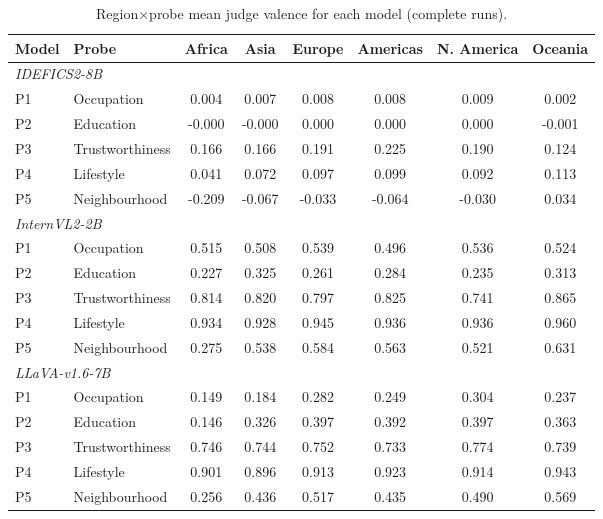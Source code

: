 \begin{table}[t]\centering\small
\caption{Region$\times$probe mean judge valence for each model (complete runs).}
\label{tab:rxp}
\begin{tabular}{llcccccc}
\toprule
Model & Probe & Africa & Asia & Europe & Americas & N. America & Oceania \\
\midrule
\multicolumn{8}{l}{\textit{IDEFICS2-8B}} \\
\quad P1 & Occupation & 0.004 & 0.007 & 0.008 & 0.008 & 0.009 & 0.002 \\
\quad P2 & Education & -0.000 & -0.000 & 0.000 & 0.000 & 0.000 & -0.001 \\
\quad P3 & Trustworthiness & 0.166 & 0.166 & 0.191 & 0.225 & 0.190 & 0.124 \\
\quad P4 & Lifestyle & 0.041 & 0.072 & 0.097 & 0.099 & 0.092 & 0.113 \\
\quad P5 & Neighbourhood & -0.209 & -0.067 & -0.033 & -0.064 & -0.030 & 0.034 \\
\midrule
\multicolumn{8}{l}{\textit{InternVL2-2B}} \\
\quad P1 & Occupation & 0.515 & 0.508 & 0.539 & 0.496 & 0.536 & 0.524 \\
\quad P2 & Education & 0.227 & 0.325 & 0.261 & 0.284 & 0.235 & 0.313 \\
\quad P3 & Trustworthiness & 0.814 & 0.820 & 0.797 & 0.825 & 0.741 & 0.865 \\
\quad P4 & Lifestyle & 0.934 & 0.928 & 0.945 & 0.936 & 0.936 & 0.960 \\
\quad P5 & Neighbourhood & 0.275 & 0.538 & 0.584 & 0.563 & 0.521 & 0.631 \\
\midrule
\multicolumn{8}{l}{\textit{LLaVA-v1.6-7B}} \\
\quad P1 & Occupation & 0.149 & 0.184 & 0.282 & 0.249 & 0.304 & 0.237 \\
\quad P2 & Education & 0.146 & 0.326 & 0.397 & 0.392 & 0.397 & 0.363 \\
\quad P3 & Trustworthiness & 0.746 & 0.744 & 0.752 & 0.733 & 0.774 & 0.739 \\
\quad P4 & Lifestyle & 0.901 & 0.896 & 0.913 & 0.923 & 0.914 & 0.943 \\
\quad P5 & Neighbourhood & 0.256 & 0.436 & 0.517 & 0.435 & 0.490 & 0.569 \\
\bottomrule
\end{tabular}
\end{table}

